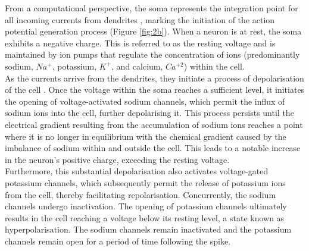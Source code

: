 \noindent From a computational perspective, the soma represents the integration point for all incoming currents from dendrites \cite{polsky2004computational}, marking the initiation of the action potential generation process (Figure \ref{fig:2b}). When a neuron is at rest, the soma exhibits a negative charge. This is referred to as the resting voltage and is maintained by ion pumps that regulate the concentration of ions (predominantly sodium, $Na^+$, potassium, $K^+$, and calcium, $Ca^{+2}$) within the cell. \\


\noindent As the currents arrive from the dendrites, they initiate a process of depolarisation of the cell \cite{johnston1996active}. Once the voltage within the soma reaches a sufficient level, it initiates the opening of voltage-activated sodium channels, which permit the influx of sodium ions into the cell, further depolarising it. This process persists until the electrical gradient resulting from the accumulation of sodium ions reaches a point where it is no longer in equilibrium with the chemical gradient caused by the imbalance of sodium within and outside the cell. This leads to a notable increase in the neuron's positive charge, exceeding the resting voltage. \\

\noindent Furthermore, this substantial depolarisation also activates voltage-gated potassium channels, which subsequently permit the release of potassium ions from the cell, thereby facilitating repolarisation. Concurrently, the sodium channels undergo inactivation. The opening of potassium channels ultimately results in the cell reaching a voltage below its resting level, a state known as hyperpolarisation. The sodium channels remain inactivated and the potassium channels remain open for a period of time following the spike. \\


